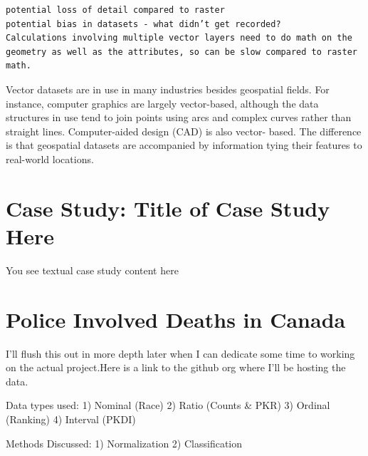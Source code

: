 \documentclass[
]{book}
\begin{document}
\begin{verbatim}
potential loss of detail compared to raster
potential bias in datasets - what didn’t get recorded?
Calculations involving multiple vector layers need to do math on the geometry as well as the attributes, so can be slow compared to raster math.
\end{verbatim}

Vector datasets are in use in many industries besides geospatial fields. For instance, computer graphics are largely vector-based, although the data structures in use tend to join points using arcs and complex curves rather than straight lines. Computer-aided design (CAD) is also vector- based. The difference is that geospatial datasets are accompanied by information tying their features to real-world locations.

\hypertarget{case-study-title-of-case-study-here}{%
\section{Case Study: Title of Case Study Here}\label{case-study-title-of-case-study-here}}

You see textual case study content here

\hypertarget{box-text}{%
\section*{Police Involved Deaths in Canada}\label{box-text}}

I'll flush this out in more depth later when I can dedicate some time to working on the actual project.Here is a link to the github org where I'll be hosting the data.

Data types used:
1) Nominal (Race)
2) Ratio (Counts \& PKR)
3) Ordinal (Ranking)
4) Interval (PKDI)

Methods Discussed:
1) Normalization
2) Classification
\end{document}
